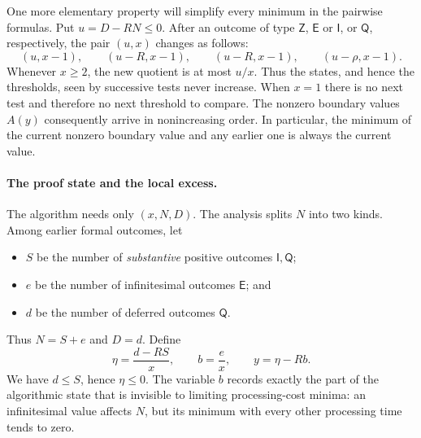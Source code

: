 One more elementary property will simplify every minimum in the pairwise
formulas.  Put $u=D-RN\le0$.  After an outcome of type $\mathsf Z$,
$\mathsf E$ or $\mathsf I$, or $\mathsf Q$, respectively, the pair $(u,x)$
changes as follows:
\[
 (u,x-1),\qquad (u-R,x-1),\qquad (u-R,x-1),\qquad
 (u-\rho,x-1).
\]
Whenever $x\ge2$, the new quotient is at most $u/x$.  Thus the states, and
hence the thresholds, seen by successive tests never increase.  When $x=1$
there is no next test and therefore no next threshold to compare.  The
nonzero boundary values $A(y)$ consequently arrive in nonincreasing order.
In particular, the minimum of the current nonzero boundary value and any
earlier one is always the current value.

\paragraph{The proof state and the local excess.}
The algorithm needs only $(x,N,D)$.  The analysis splits $N$ into two kinds.
Among earlier formal outcomes, let
\begin{itemize}
\item $S$ be the number of \emph{substantive} positive outcomes
      $\mathsf I,\mathsf Q$;
\item $e$ be the number of infinitesimal outcomes $\mathsf E$; and
\item $d$ be the number of deferred outcomes $\mathsf Q$.
\end{itemize}
Thus $N=S+e$ and $D=d$.  Define
\begin{equation}
\label{eq:upper-eta-b}
 \eta=\frac{d-RS}{x},
 \qquad
 b=\frac e x,
 \qquad
 y=\eta-Rb.
\end{equation}
We have $d\le S$, hence $\eta\le0$.  The variable $b$ records exactly the
part of the algorithmic state that is invisible to limiting processing-cost
minima: an infinitesimal value affects $N$, but its minimum with every other
processing time tends to zero.

